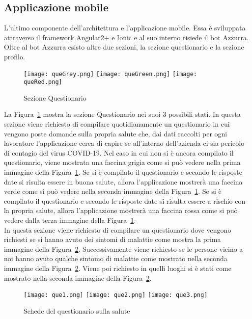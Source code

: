 \begin{trivlist}
	\item\subsection{Applicazione mobile}
	L'ultimo componente dell'architettura e l'applicazione mobile. Essa è sviluppata attraverso il framework Angular2+ e Ionic e al suo interno risiede il bot Azzurra. Oltre al bot Azzurra esisto altre due sezioni, la sezione questionario e la sezione profilo. 
	
	\begin{figure}[h]
		\centering
		\texttt{[image: queGrey.png]}\hfill
		\texttt{[image: queGreen.png]}\hfill
		\texttt{[image: queRed.png]}
		\caption{Sezione Questionario}\label{fig:que}
	\end{figure}
	
	La Figura~\ref{fig:que} mostra la sezione Questionario nei suoi 3 possibili stati. In questa sezione viene richiesto di compilare quotidianamente un questionario in cui vengono poste domande sulla propria salute che, dai dati raccolti per ogni lavoratore l'applicazione cerca di capire se all'interno dell'azienda ci sia pericolo di contagio del virus COVID-19. Nel caso in cui non si è ancora compilato il questionario, viene mostrata una faccina grigia come si può vedere nella prima immagine della Figura~\ref{fig:que}. Se si è compilato il questionario e secondo le risposte date si risulta essere in buona salute, allora l'applicazione mostrerà una faccina verde come si può vedere nella seconda immagine della Figura~\ref{fig:que}. Se si è compilato il questionario e secondo le risposte date si risulta essere a rischio con la propria salute, allora l'applicazione mostrerà una faccina rossa come si può vedere dalla terza immagine della Figura~\ref{fig:que}.
	\\
	\clearpage
	In questa sezione viene richiesto di compilare un questionario dove vengono richiesti se si hanno avuto dei sintomi di malattie come mostra la prima immagine della Figura~\ref{fig:queSlide}. Successivamente viene richiesto se le persone vicino a noi hanno avuto qualche sintomo di malattie come mostrato nella seconda immagine della Figura~\ref{fig:queSlide}. Viene poi richiesto in quelli luoghi si è stati come mostrato nella seconda immagine della Figura~\ref{fig:queSlide}.
	\begin{figure}[h]
		\begin{center}
			\texttt{[image: que1.png]}\hfill
			\texttt{[image: que2.png]}\hfill
			\texttt{[image: que3.png]}
			\caption{Schede del questionario sulla salute}\label{fig:queSlide}
		\end{center}
	\end{figure}


\end{trivlist}
